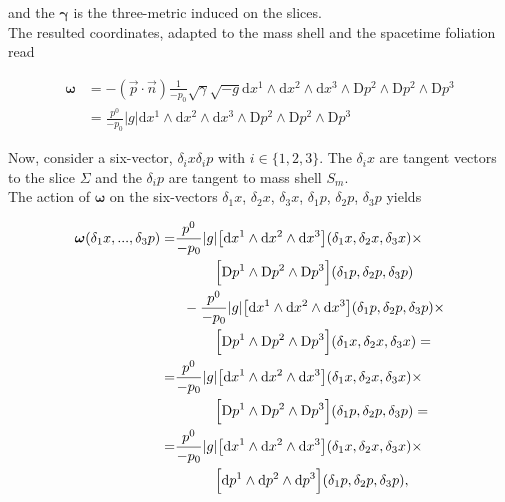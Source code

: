 \documentclass[11pt,a4paper,headinclude=true,DIV=14,BCOR=8mm,chapterprefix,listof=totoc,twoside,openright,abstracton]{scrbook}
\begin{document}
and the $\boldsymbol{\gamma}$ is the three-metric induced on the slices.  \\
The resulted coordinates, adapted to the mass shell and the spacetime foliation read

\begin{align}
    \boldsymbol{\omega} &=-(\vec{p}\cdot\vec{n})\frac{1}{-p_0}\sqrt{\gamma}\sqrt{-g}\text{d}x^1\wedge\text{d}x^2\wedge\text{d}x^3 \wedge\text{D}p^2\wedge\text{D}p^2\wedge\text{D}p^3 \\
    &= \frac{p^0}{-p_0}|g|\text{d}x^1 \wedge\text{d}x^2\wedge\text{d}x^3 \wedge\text{D}p^2\wedge\text{D}p^2\wedge\text{D}p^3
\end{align}

Now, consider a six-vector, $\delta_i x \delta_i p$ with $i\in\{1,2,3\}$. The $\delta_i x$ are tangent vectors to the slice $\Sigma$ and the $\delta_i p$ are tangent to mass shell $S_m$. \\
The action of $\boldsymbol{\omega}$ on the six-vectors $\delta_1 x$, $\delta_2 x$, $\delta_3 x$, $\delta_1 p$, $\delta_2 p$, $\delta_3 p$ yields

\begin{align}
    \boldsymbol{\omega}(\delta_1 x,...,\delta_3 p) =& \frac{p^0}{-p_0}|g|\big[\text{d}x^1\wedge\text{d}x^2\wedge\text{d}x^3\big](\delta_{1}x,\delta_{2}x,\delta_{3}x)\times \\
    & \hspace{10mm} \Big[\text{D}p^1\wedge\text{D}p^2\wedge\text{D}p^3\Big](\delta_1 p, \delta_2 p, \delta_3 p) \\
    & \hspace{2mm} -\frac{p^0}{-p_0}|g|\big[\text{d}x^1\wedge\text{d}x^2\wedge\text{d}x^3\big](\delta_{1}p,\delta_{2}p,\delta_{3}p)\times \\
    & \hspace{10mm} \Big[\text{D}p^1\wedge\text{D}p^2\wedge\text{D}p^3\Big](\delta_1 x, \delta_2 x, \delta_3 x) = \\
    =& \frac{p^0}{-p_0}|g|\big[\text{d}x^1\wedge\text{d}x^2\wedge\text{d}x^3\big](\delta_{1}x,\delta_{2}x,\delta_{3}x)\times \\
    & \hspace{10mm} \Big[\text{D}p^1\wedge\text{D}p^2\wedge\text{D}p^3\Big](\delta_1 p, \delta_2 p, \delta_3 p) = \\
    =& \frac{p^0}{-p_0}|g|\big[\text{d}x^1\wedge\text{d}x^2\wedge\text{d}x^3\big](\delta_{1}x,\delta_{2}x,\delta_{3}x)\times \\
    & \hspace{10mm} \Big[\text{d}p^1\wedge\text{d}p^2\wedge\text{d}p^3\Big](\delta_1 p, \delta_2 p, \delta_3 p), \\
\end{align}
\end{document}
